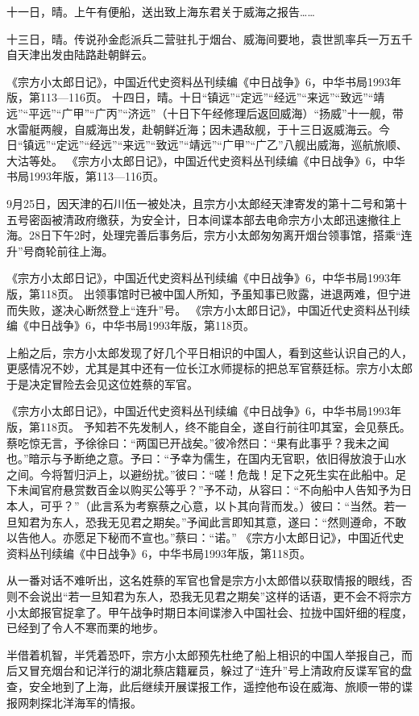 \documentclass[12pt,UTF8]{ctexbook}
\begin{document}
十一日，晴。上午有便船，送出致上海东君关于威海之报告……

十三日，晴。传说孙金彪派兵二营驻扎于烟台、威海间要地，袁世凯率兵一万五千自天津出发由陆路赴朝鲜云。

《宗方小太郎日记》，中国近代史资料丛刊续编《中日战争》6，中华书局1993年版，第113—116页。
十四日，晴。十日“镇远”“定远”“经远”“来远”“致远”“靖远”“平远”“广甲”“广丙”“济远”（十日下午经修理后返回威海）“扬威”十一舰，带水雷艇两艘，自威海出发，赴朝鲜近海；因未遇敌舰，于十三日返威海云。今日“镇远”“定远”“经远”“来远”“致远”“靖远”“广甲”“广乙”八舰出威海，巡航旅顺、大沽等处。 《宗方小太郎日记》，中国近代史资料丛刊续编《中日战争》6，中华书局1993年版，第113—116页。

9月25日，因天津的石川伍一被处决，且宗方小太郎经天津寄发的第十二号和第十五号密函被清政府缴获，为安全计，日本间谍本部去电命宗方小太郎迅速撤往上海。28日下午2时，处理完善后事务后，宗方小太郎匆匆离开烟台领事馆，搭乘“连升”号商轮前往上海。

《宗方小太郎日记》，中国近代史资料丛刊续编《中日战争》6，中华书局1993年版，第118页。
出领事馆时已被中国人所知，予虽知事已败露，进退两难，但宁进而失败，遂决心断然登上“连升”号。 《宗方小太郎日记》，中国近代史资料丛刊续编《中日战争》6，中华书局1993年版，第118页。

上船之后，宗方小太郎发现了好几个平日相识的中国人，看到这些认识自己的人，更感情况不妙，尤其是其中还有一位长江水师提标的把总军官蔡廷标。宗方小太郎于是决定冒险去会见这位姓蔡的军官。

《宗方小太郎日记》，中国近代史资料丛刊续编《中日战争》6，中华书局1993年版，第118页。
予知若不先发制人，终不能自全，遂自行前往叩其室，会见蔡氏。蔡吃惊无言，予徐徐曰：“两国已开战矣。”彼冷然曰：“果有此事乎？我未之闻也。”暗示与予断绝之意。予曰：“予幸为儒生，在国内无官职，依旧得放浪于山水之间。今将暂归沪上，以避纷扰。”彼曰：“嗟！危哉！足下之死生实在此船中。足下未闻官府悬赏数百金以购买公等乎？”予不动，从容曰：“不向船中人告知予为日本人，可乎？”（此言系为考察蔡之心意，以卜其向背而发。）彼曰：“当然。若一旦知君为东人，恐我无见君之期矣。”予闻此言即知其意，遂曰：“然则遵命，不敢以告他人。亦愿足下秘而不宣也。”蔡曰：“诺。” 《宗方小太郎日记》，中国近代史资料丛刊续编《中日战争》6，中华书局1993年版，第118页。

从一番对话不难听出，这名姓蔡的军官也曾是宗方小太郎借以获取情报的眼线，否则不会说出“若一旦知君为东人，恐我无见君之期矣”这样的话语，更不会不将宗方小太郎报官捉拿了。甲午战争时期日本间谍渗入中国社会、拉拢中国奸细的程度，已经到了令人不寒而栗的地步。

半借着机智，半凭着恐吓，宗方小太郎预先杜绝了船上相识的中国人举报自己，而后又冒充烟台和记洋行的湖北蔡店籍雇员，躲过了“连升”号上清政府反谍军官的盘查，安全地到了上海，此后继续开展谍报工作，遥控他布设在威海、旅顺一带的谍报网刺探北洋海军的情报。
\end{document}
